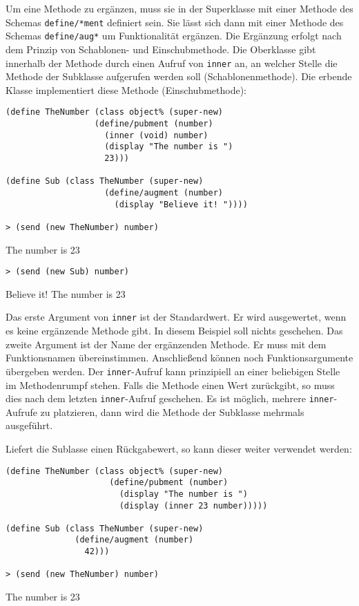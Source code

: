 Um eine Methode zu ergänzen, muss sie in der Superklasse mit einer Methode des Schemas \texttt{define/*ment} definiert sein. Sie lässt sich dann mit einer Methode des Schemas \texttt{define/aug*} um Funktionalität ergänzen. Die Ergänzung erfolgt nach dem Prinzip von Schablonen- und Einschubmethode. Die Oberklasse gibt innerhalb der Methode durch einen Aufruf von \texttt{inner} an, an welcher Stelle die Methode der Subklasse aufgerufen werden soll (Schablonenmethode). Die erbende Klasse implementiert diese Methode (Einschubmethode):

\begin{lstlisting}
(define TheNumber (class object% (super-new)
                  (define/pubment (number)
                    (inner (void) number)
                    (display "The number is ")
                    23)))

(define Sub (class TheNumber (super-new)
                    (define/augment (number)
                      (display "Believe it! "))))
                      
> (send (new TheNumber) number)
\end{lstlisting}
{\routput The number is 23}

\begin{lstlisting}                
> (send (new Sub) number)
\end{lstlisting}
{\routput Believe it! The number is 23}

Das erste Argument von \texttt{inner} ist der Standardwert. Er wird ausgewertet, wenn es keine ergänzende Methode gibt. In diesem Beispiel soll nichts geschehen. Das zweite Argument ist der Name der ergänzenden Methode. Er muss mit dem Funktionsnamen übereinstimmen. Anschließend können noch Funktionsargumente übergeben werden. Der \texttt{inner}-Aufruf kann prinzipiell an einer beliebigen Stelle im Methodenrumpf stehen. Falls die Methode einen Wert zurückgibt, so muss dies nach dem letzten \texttt{inner}-Aufruf geschehen. Es ist möglich, mehrere \texttt{inner}-Aufrufe zu platzieren, dann wird die Methode der Subklasse mehrmals ausgeführt. 

Liefert die Sublasse einen Rückgabewert, so kann dieser weiter verwendet werden:

\begin{lstlisting}
(define TheNumber (class object% (super-new)
                     (define/pubment (number)
                       (display "The number is ")
                       (display (inner 23 number)))))

(define Sub (class TheNumber (super-new)
              (define/augment (number)
                42)))

> (send (new TheNumber) number)
\end{lstlisting}
{\routput The number is 23}

